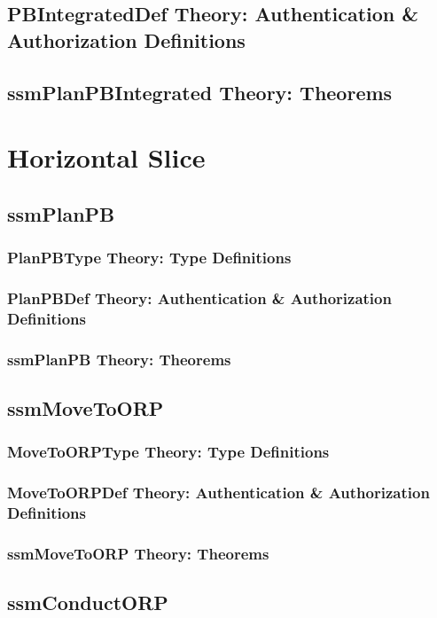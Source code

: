 \documentclass[hidelinks,12pt,a4paper]{report}
\begin{document}
\begin{appendices}
\subsection{PBIntegratedDef Theory: Authentication \& Authorization Definitions}

\subsection{ssmPlanPBIntegrated Theory: Theorems}



\section{Horizontal Slice}
\subsection{ssmPlanPB}
\subsubsection{PlanPBType Theory: Type Definitions}
\subsubsection{PlanPBDef Theory: Authentication \& Authorization Definitions}
\subsubsection{ssmPlanPB Theory: Theorems}

\subsection{ssmMoveToORP}
\subsubsection{MoveToORPType Theory: Type Definitions}
\subsubsection{MoveToORPDef Theory: Authentication \& Authorization Definitions}
\subsubsection{ssmMoveToORP Theory: Theorems}

\subsection{ssmConductORP}

\end{appendices}
\end{document}
